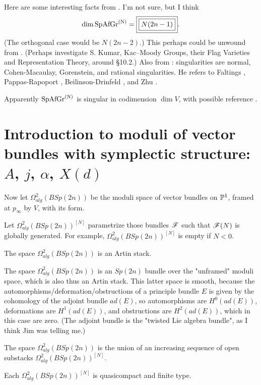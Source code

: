 {Here are some interesting facts from \cite{zhu}.
I'm not sure, but I think \begin{equation}\label{eq:dimsag}
  \dim \rm{SpAfGr}^{(N)} = \boxed{\boxed{N (2n-1)}}.
\end{equation}
(The orthogonal case would be $\boxed{\boxed{N(2n-2)}}$.)
This perhaps could be unwound from \cite[S 2.3]{zhu}.  (Perhaps investigate
S. Kumar, Kac–Moody Groups, their Flag Varieties and Representation Theory, around \S 10.2.)
Also from 
\cite[Thm.~2.1.21]{zhu}:  singularities are normal, Cohen-Macaulay, Gorenstein, and rational singularities.   He refers to Faltings \cite[ref.\ 24]{zhu}, Pappas-Rapoport \cite[ref.\ 60]{zhu}, Beilinson-Drinfeld \cite[ref.\ 11]{zhu}, and Zhu \cite[ref.\ 80]{zhu}.

Apparently $\rm{SpAfGr}^{(N)}$  is singular in codimension $\dim V$, with possible reference  \cite{mov}. 


\section{Introduction to moduli of vector bundles with symplectic structure:  $A$, $j$, $\alpha$, $X(d)$}

Now let $\boxed{\Omega^2_{alg}(BSp(2n))}$  be the moduli space of vector bundles on $\mathbb P^1$, framed at $p_\infty$ by $V$, with its form.

Let $\boxed{\Omega^2_{alg}(BSp(2n))^{[N]}}$ parametrize those bundles ${\mathscr{F}}$ such that ${\mathscr{F}}(N)$ is globally generated. For example, 
$\Omega^2_{alg}(BSp(2n))^{[N]}$ is empty if $N<0$.

The space 
$\Omega^2_{alg}(BSp(2n))$ 
is an Artin stack.  

 The space 
$\Omega^2_{alg}(BSp(2n))$ is an $Sp(2n)$ bundle over the "unframed" moduli space, which is also thus an Artin stack.  This latter space is smooth, because the automorphisms/deformation/obstructions of a principle bundle $E$ is given by the cohomology of the adjoint bundle $ad(E)$, so automorphisms are $H^0(ad(E))$, deformations are $H^1(ad(E))$, and obstructions are $H^2(ad(E))$, which in this case are zero.  (The adjoint bundle is the "twisted Lie algebra bundle", as I think Jim was telling me.)



The space 
$\Omega^2_{alg}(BSp(2n))$  is the union of an increasing sequence of open substacks
$\Omega^2_{alg}(BSp(2n))^{[N]}$.

Each $\Omega^2_{alg}(BSp(2n))^{[N]}$ is quasicompact and finite type.  

}
